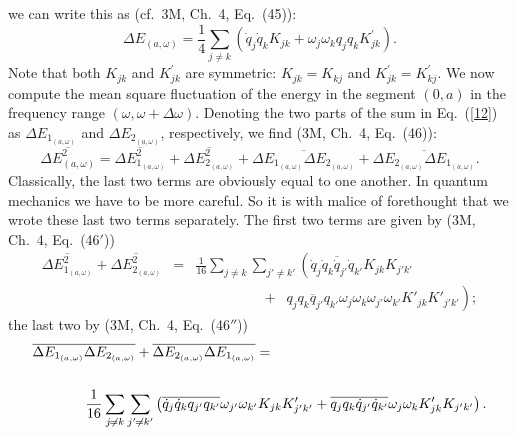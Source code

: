 \documentclass[12pt]{elsart}
\begin{document}
we can write this as (cf.\ 3M, Ch.\ 4, Eq.\ (45)):
\begin{equation}
\Delta E_{(a, \omega)} =  \frac{1}{4}  \sum_{j \neq k} \left( \dot{q}_j \dot{q}_k K_{jk}
+ \omega_j \omega_k q_j q_k K^\prime_{jk} \right).
\label{12}
\end{equation}
Note that both $K_{jk}$ and $K^\prime_{jk}$ are symmetric: $K_{jk} = K_{kj}$ and $K^\prime_{jk} = K^\prime_{kj}$.
We now compute the mean square fluctuation of the energy in the segment $(0, a)$  in the frequency range $(\omega, \omega + \Delta \omega)$. Denoting the two parts of the sum in Eq.\ (\ref{12}) as $\Delta E_{1_{(a, \omega)}}$ and $\Delta E_{2_{(a, \omega)}}$, respectively, we find (3M, Ch.\ 4, Eq.\ (46)):
\begin{equation}
\overline{\Delta E_{(a, \omega)}^2}  =  \overline{\Delta E_{1_{(a, \omega)}}^2} + \overline{\Delta E_{2_{(a, \omega)}}^2} + 
\overline{\Delta E_{1_{(a, \omega)}} \Delta E_{2_{(a, \omega)}}} + \overline{\Delta E_{2_{(a, \omega)}} \Delta E_{1_{(a, \omega)}}}.
\label{13}
\end{equation}
Classically, the last two terms are obviously equal to one another. In quantum mechanics we have to be more careful. So it is with malice of forethought that we wrote these last two terms separately. The first two terms are given by (3M, Ch.\ 4, Eq.\ (46$'$))
\begin{eqnarray}
\overline{\Delta E_{1_{(a, \omega)}}^2} + \overline{\Delta E_{2_{(a, \omega)}}^2} & = &
\frac{1}{16}  \sum_{j \neq k}  \sum_{j' \neq k'} \left(
\overline{ \dot{q}_j \dot{q}_k  \dot{q}_{j'} \dot{q}_{k'}} K_{jk} K_{j'k'}  \right. \nonumber \\
 & & \;\;\;\;\;\;\;\;\;\;\;\;\;\;\;\;\; + \;\; \left.
\overline{q_j q_k q_{j'} q_{k'}}  \omega_j \omega_k \omega_{j'} \omega_{k'}
 K'_{jk} K'_{j'k'} \right);
\label{14}
\end{eqnarray}
the last two by (3M, Ch.\ 4, Eq.\ (46$''$))
\begin{eqnarray}
\lefteqn{ \overline{\Delta E_{1_{(a, \omega)}} \Delta E_{2_{(a, \omega)}}} + \overline{\Delta E_{2_{(a, \omega)}} \Delta E_{1_{(a, \omega)}}} = }
 & & \nonumber \\
 & &\label{15} \\
 & & \;\;\;\;\;\;\;\;\;\; \frac{1}{16}  \sum_{j \neq k}  \sum_{j' \neq k'} 
\left( \overline{\dot{q}_j \dot{q}_k q_{j'} q_{k'} } \omega_{j'} \omega_{k'}  K_{jk} K'_{j'k'}
 +
 \overline{q_j q_k \dot{q}_{j'} \dot{q}_{k'}} \omega_j \omega_k K'_{jk} K_{j'k'}\right).  \nonumber
\end{eqnarray}
\end{document}
